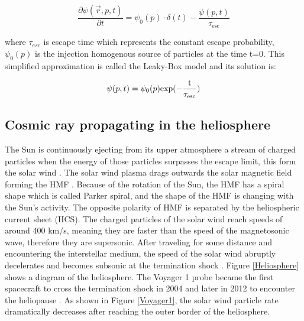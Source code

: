 \begin{equation}  
\frac{ \partial \psi(\vec{r},p,t)}{\partial t} = \psi_{0}(p) \cdot \delta(t) - \frac{\psi(p,t)}{\tau_\mathrm{esc}}
\end{equation}

where $\tau_{esc}$ is escape time which represents the constant escape probability, $\psi_{0}(p)$ is the injection homogenous source of particles at the time t=0. This simplified approximation is called the Leaky-Box model \cite{LeakyBoxModel} and its solution is:

\begin{equation}  
\psi(p,t) = \psi_{0}(p)\rm{exp}(-\frac{t}{\tau_\mathrm{esc}}) 
\end{equation}


\subsection{Cosmic ray propagating in the heliosphere}
The Sun is continuously ejecting from its upper atmosphere a stream of charged particles when the energy of those particles surpasses the escape limit, this form the solar wind \cite{SolarWind1, SolarWind2}. The solar wind plasma drags outwards the solar magnetic field forming the HMF \cite{HeliosphericMagneticField}. Because of the rotation of the Sun, the HMF has a spiral shape which is called Parker spiral, and the shape of the HMF is changing with the Sun's activity. The opposite polarity of HMF is separated by the heliospheric current sheet (HCS). The charged particles of the solar wind reach speeds of around 400 km/s, meaning they are faster than the speed of the magnetosonic wave, therefore they are supersonic. After traveling for some distance and encountering the interstellar medium, the speed of the solar wind abruptly decelerates and becomes subsonic at the termination shock \cite{HeliospherePaper}. Figure \ref{Heliosphere} shows a diagram of the heliosphere. The Voyager 1 probe became the first spacecraft to cross the termination shock in 2004 and later in 2012 to encounter the heliopause \cite{Voyager1Paper}. As shown in Figure \ref{Voyager1}, the solar wind particle rate dramatically decreases after reaching the outer border of the heliosphere.

